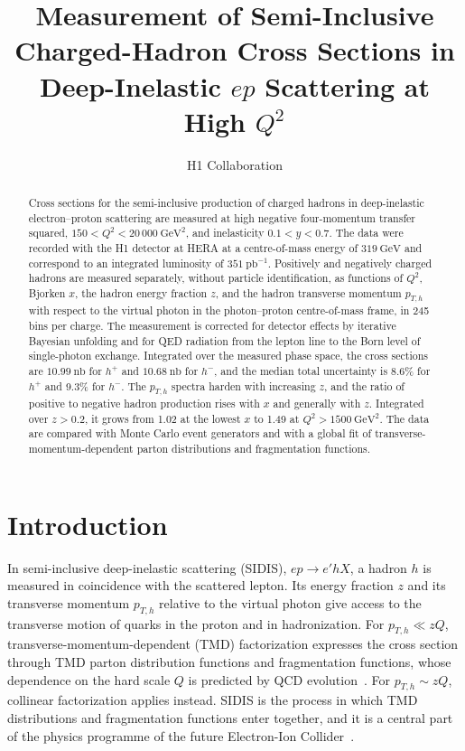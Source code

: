 \documentclass[11pt,a4paper]{article}
\title{Measurement of Semi-Inclusive Charged-Hadron Cross Sections in Deep-Inelastic $ep$ Scattering at High $Q^{2}$}
\author{H1 Collaboration}
\date{\draft{DRAFT, \today}}
\newcommand{\Qsq}{Q^{2}}
\newcommand{\pTh}{p_{T,h}}
\newcommand{\hplus}{h^{+}}
\newcommand{\hminus}{h^{-}}
\newcommand{\GeV}{\mathrm{GeV}}
\newcommand{\GeVsq}{\mathrm{GeV}^{2}}
\newcommand{\pbinv}{\mathrm{pb}^{-1}}
\newcommand{\nb}{\mathrm{nb}}
\begin{document}
\maketitle

\begin{abstract}
Cross sections for the semi-inclusive production of charged hadrons in deep-inelastic electron--proton scattering are measured at high negative four-momentum transfer squared, $150<\Qsq<20\,000~\GeVsq$, and inelasticity $0.1<y<0.7$. The data were recorded with the H1 detector at HERA at a centre-of-mass energy of $319~\GeV$ and correspond to an integrated luminosity of $351~\pbinv$. Positively and negatively charged hadrons are measured separately, without particle identification, as functions of $\Qsq$, Bjorken $x$, the hadron energy fraction $z$, and the hadron transverse momentum $\pTh$ with respect to the virtual photon in the photon--proton centre-of-mass frame, in 245 bins per charge. The measurement is corrected for detector effects by iterative Bayesian unfolding and for QED radiation from the lepton line to the Born level of single-photon exchange. Integrated over the measured phase space, the cross sections are $10.99~\nb$ for $\hplus$ and $10.68~\nb$ for $\hminus$, and the median total uncertainty is 8.6\% for $\hplus$ and 9.3\% for $\hminus$. The $\pTh$ spectra harden with increasing $z$, and the ratio of positive to negative hadron production rises with $x$ and generally with $z$. Integrated over $z>0.2$, it grows from 1.02 at the lowest $x$ to 1.49 at $\Qsq>1500~\GeVsq$. The data are compared with Monte Carlo event generators and with a global fit of transverse-momentum-dependent parton distributions and fragmentation functions.
\end{abstract}

\section{Introduction}
\label{sec:intro}

In semi-inclusive deep-inelastic scattering (SIDIS), $ep\to e'hX$, a hadron $h$ is measured in coincidence with the scattered lepton. Its energy fraction $z$ and its transverse momentum $\pTh$ relative to the virtual photon give access to the transverse motion of quarks in the proton and in hadronization. For $\pTh\ll zQ$, transverse-momentum-dependent (TMD) factorization expresses the cross section through TMD parton distribution functions and fragmentation functions, whose dependence on the hard scale $Q$ is predicted by QCD evolution~\cite{Collins:2011zzd,Scimemi:2019cmh}. For $\pTh\sim zQ$, collinear factorization applies instead. SIDIS is the process in which TMD distributions and fragmentation functions enter together, and it is a central part of the physics programme of the future Electron-Ion Collider~\cite{AbdulKhalek:2021gbh}.
\end{document}
